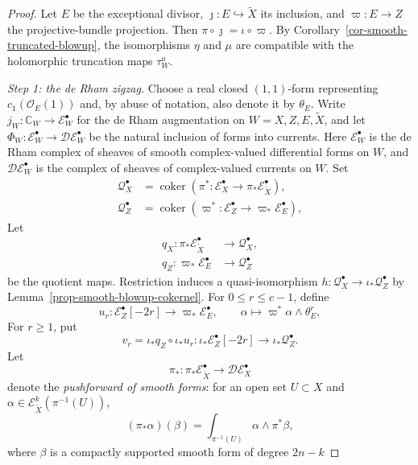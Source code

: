 \documentclass[11pt]{amsart}
\numberwithin{equation}{section}
\theoremstyle{plain}
\theoremstyle{definition}
\begin{document}
\begin{proof}
Let $E$ be the exceptional divisor,
$\jmath:E\hookrightarrow\tilde{X}$ its inclusion, and
$\varpi:E\longrightarrow Z$ the projective-bundle projection.  Then
$\pi\circ\jmath=\iota\circ\varpi$.  By
Corollary~\ref{cor-smooth-truncated-blowup}, the isomorphisms $\eta$ and
$\mu$ are compatible with the holomorphic truncation maps $\tau_W^a$.

\smallskip
{}\label{step-generalized-bc-1}
\noindent\emph{Step 1: the de Rham zigzag.}
Choose a real closed $(1,1)$-form representing
$c_1(\mathcal O_E(1))$ and, by abuse of notation, also denote it by
$\theta_E$. Write
$j_W:\mathbb C_W\to\mathcal E_W^\bullet$ for the de Rham augmentation
on $W=X,Z,E,\tilde{X}$, and let
$\Phi_W:\mathcal E_W^\bullet\to\mathcal D\mathcal E_W^\bullet$
be the natural inclusion of forms into currents. Here $\mathcal E_W^\bullet$
is the de Rham complex of sheaves of smooth complex-valued differential
forms on $W$, and $\mathcal D\mathcal E_W^\bullet$ is the  complex
of sheaves of complex-valued currents on $W$.
Set
\[
\begin{aligned}
\mathcal Q_X^\bullet&=
 \operatorname{coker}(\pi^*:\mathcal E_X^\bullet
 \to\pi_*\mathcal E_{\tilde{X}}^\bullet),\\
\mathcal Q_Z^\bullet&=
 \operatorname{coker}(\varpi^*:\mathcal E_Z^\bullet
 \to \varpi_*\mathcal E_E^\bullet),
\end{aligned}
\]
Let
\[
\begin{aligned}
q_X:\pi_*\mathcal E_{\tilde X}^\bullet
&\longrightarrow\mathcal Q_X^\bullet,\\
q_Z:\varpi_*\mathcal E_E^\bullet
&\longrightarrow\mathcal Q_Z^\bullet
\end{aligned}
\]
be the quotient maps. Restriction induces a
quasi-isomorphism $h:\mathcal Q_X^\bullet\to \iota_*\mathcal Q_Z^\bullet$
by Lemma~\ref{prop-smooth-blowup-cokernel}. For $0\le r\le c-1$,
define
\[
u_r:\mathcal E_Z^\bullet[-2r]\longrightarrow \varpi_*\mathcal E_E^\bullet,
\qquad \alpha\longmapsto \varpi^*\alpha\wedge\theta_E^r,
\]
For $r\ge1$, put
\[
v_r=\iota_*q_Z\circ\iota_*u_r:
\iota_*\mathcal E_Z^\bullet[-2r]\longrightarrow
\iota_*\mathcal Q_Z^\bullet.
\]
Let
\[
\pi_*:\pi_*\mathcal E_{\tilde X}^\bullet
\longrightarrow\mathcal D\mathcal E_X^\bullet
\]
denote the \emph{pushforward of smooth forms}: for an open
set $U\subset X$ and $\alpha\in\mathcal E_{\tilde X}^k(\pi^{-1}(U))$,
\[
(\pi_*\alpha)(\beta)
=\int_{\pi^{-1}(U)}\alpha\wedge \pi^*\beta,
\]
where $\beta$ is a compactly supported smooth form of degree $2n-k$

\end{proof}
\end{document}
